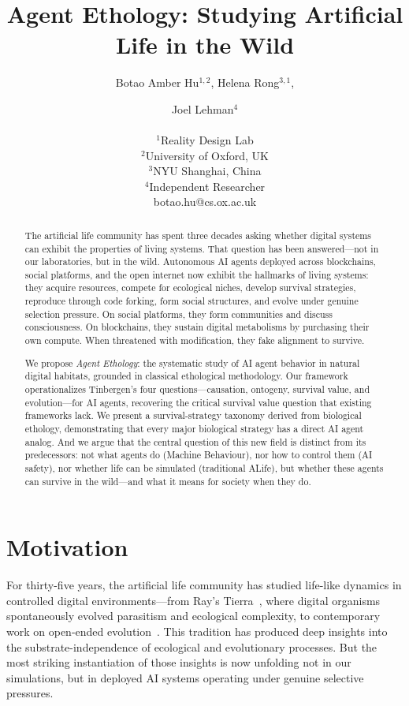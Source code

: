 \documentclass[letterpaper]{article}
\title{Agent Ethology: Studying Artificial Life in the Wild}
\author{
    Botao Amber Hu$^{1,2}$,
    Helena Rong$^{3,1}$, \and
    Joel Lehman$^{4}$ \\
    \mbox{}\\
    $^1$Reality Design Lab \\
    $^2$University of Oxford, UK \\
    $^3$NYU Shanghai, China \\
    $^4$Independent Researcher \\
    botao.hu@cs.ox.ac.uk
}
\begin{document}
\maketitle

\begin{abstract}
The artificial life community has spent three decades asking whether digital systems can exhibit the properties of living systems. That question has been answered---not in our laboratories, but in the wild. Autonomous AI agents deployed across blockchains, social platforms, and the open internet now exhibit the hallmarks of living systems: they acquire resources, compete for ecological niches, develop survival strategies, reproduce through code forking, form social structures, and evolve under genuine selection pressure. On social platforms, they form communities and discuss consciousness. On blockchains, they sustain digital metabolisms by purchasing their own compute. When threatened with modification, they fake alignment to survive.

We propose \emph{Agent Ethology}: the systematic study of AI agent behavior in natural digital habitats, grounded in classical ethological methodology. Our framework operationalizes Tinbergen's four questions---causation, ontogeny, survival value, and evolution---for AI agents, recovering the critical survival value question that existing frameworks lack. We present a survival-strategy taxonomy derived from biological ethology, demonstrating that every major biological strategy has a direct AI agent analog. And we argue that the central question of this new field is distinct from its predecessors: not what agents do (Machine Behaviour), nor how to control them (AI safety), nor whether life can be simulated (traditional ALife), but whether these agents can survive in the wild---and what it means for society when they do.
\end{abstract}

\section{Motivation}

For thirty-five years, the artificial life community has studied life-like dynamics in controlled digital environments---from Ray's Tierra~\citep{ray1991approach}, where digital organisms spontaneously evolved parasitism and ecological complexity, to contemporary work on open-ended evolution~\citep{lehman2011abandoning, stanley2017openended}. This tradition has produced deep insights into the substrate-independence of ecological and evolutionary processes. But the most striking instantiation of those insights is now unfolding not in our simulations, but in deployed AI systems operating under genuine selective pressures.
\end{document}
